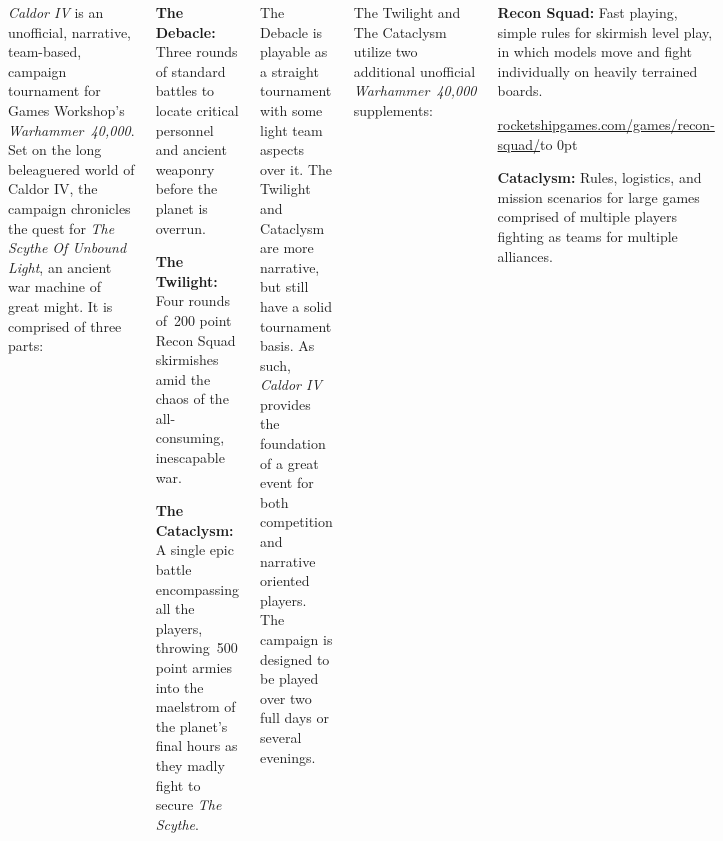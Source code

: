 \clearpage
{}

\begin{columns}
  

  \emph{Caldor IV} is an unofficial, narrative, team-based, campaign
  tournament for Games Workshop's \emph{Warhammer~40,000}.  Set on the
  long beleaguered world of Caldor IV, the campaign chronicles the
  quest for \emph{The Scythe Of Unbound Light}, an ancient war machine
  of great might.  It is comprised of three parts:

\begin{squishitemize}
\item \textbf{The Debacle:} Three rounds of standard battles to locate
  critical personnel and ancient weaponry before the planet is
  overrun.

\item \textbf{The Twilight:} Four rounds of~200 point Recon Squad
  skirmishes amid the chaos of the all-consuming, inescapable war.

\item \textbf{The Cataclysm:} A single epic battle encompassing all
  the players, throwing~500 point armies into the maelstrom of the
  planet's final hours as they madly fight to secure \emph{The
    Scythe}.
\end{squishitemize}

The Debacle is playable as a straight tournament with some light team
aspects over it.  The Twilight and Cataclysm are more narrative, but
still have a solid tournament basis.  As such, \emph{Caldor IV}
provides the foundation of a great event for both competition and
narrative oriented players.  The campaign is designed to be played
over two full days or several evenings.

The Twilight and The Cataclysm utilize two additional unofficial
\emph{Warhammer~40,000} supplements:

\begin{squishitemize}
\item \textbf{Recon Squad:} Fast playing, simple rules for skirmish
  level play, in which models move and fight
  individually on heavily terrained boards.

\hfill\url{rocketshipgames.com/games/recon-squad/}\hfill\hbox to 0pt{}

\item \textbf{Cataclysm:} Rules, logistics, and mission scenarios for
  large games comprised of multiple players fighting as teams for
  multiple alliances.


\end{squishitemize}
\end{columns}
